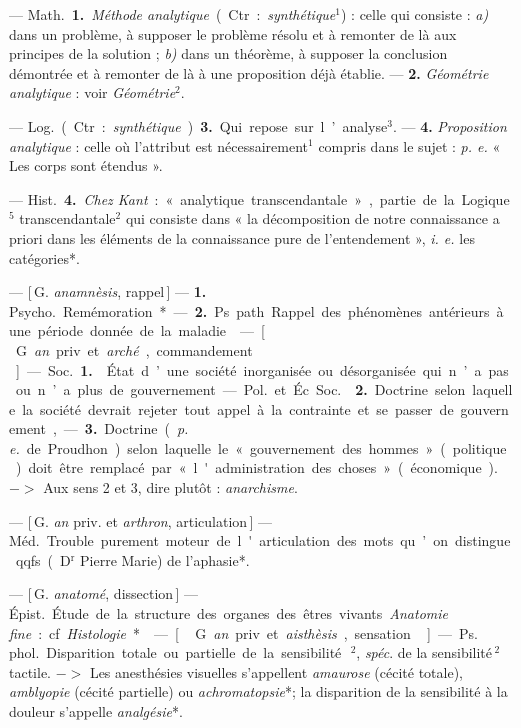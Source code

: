 \begin{itemize}[leftmargin=1cm, label=, itemsep=1pt]
{ — \si{Math.} {\bf 1.} {\it Méthode analytique} (Ctr. : {\it synthétique}$^1$) : celle
qui consiste : {\it a)} dans un problème,
à supposer le problème résolu et à
remonter de là aux principes de la
solution ; {\it b)} dans un théorème, à
supposer la conclusion démontrée et
à remonter de là à une proposition
déjà établie. — {\bf 2.} {\it Géométrie analytique} : voir {\it Géométrie}$^2$.

— \si{Log.} (Ctr. : {\it synthétique}). {\bf 3.} Qui
repose sur l’analyse$^3$. — {\bf 4.} {\it Proposition analytique} : celle où l’attribut
est nécessairement$^1$ compris dans le
sujet : {\it p. e.} « Les corps sont étendus ».

— \si{Hist.} {\bf 4.} {\it Chez Kant} : « analytique transcendantale », partie de
la Logique$^5$ transcendantale$^2$ qui
consiste dans « la décomposition de
notre connaissance a priori dans les
éléments de la connaissance pure de
l’entendement », {\it i. e.} les catégories*.

 — [\,G. {\it anamnèsis}, rappel\,] —
{\bf 1.} \si{Psycho.} Remémoration*. — {\bf 2.} Ps.
path. Rappel des phénomènes antérieurs à une période donnée de la
maladie.

 — [\,G. {\it an} priv. et {\it arché}, commandement\,] — \si{Soc.} {\bf 1.}  État
d’une société inorganisée ou désorganisée qui n’a pas ou n’a plus de
gouvernement.

— \si{Pol.} et Éc. \si{Soc.}  {\bf 2.} Doctrine
selon laquelle la société devrait
rejeter tout appel à la contrainte et
se passer de gouvernement, — {\bf 3.}
Doctrine ({\it p. e.} de Proudhon) selon
laquelle le « gouvernement des
hommes » (politique) doit être remplacé par « l'administration des
choses » (économique). $->$ Aux
sens 2 et 3, dire plutôt : {\it anarchisme}.

 — [\,G. {\it an} priv. et {\it arthron},
articulation\,] — \si{Méd.} Trouble purement moteur de l'articulation des
mots qu’on distingue qqfs (D$^\text{r}$ Pierre
Marie) de l’aphasie*.

 — [\,G. {\it anatomé}, dissection\,]
— \si{Épist.} Étude de la structure des
organes des êtres vivants. {\it Anatomie
fine} : cf.  {\it Histologie}*.

 — [\,G. {\it an} priv. et {\it aisthèsis},
sensation\,] — \si{Ps. phol.} Disparition
totale ou partielle de la sensibilité\,$^2$,
{\it spéc}. de la sensibilité\,$^2$ tactile. $->$
Les anesthésies visuelles s’appellent
{\it amaurose} (cécité totale), {\it amblyopie}
(cécité partielle) ou {\it achromatopsie}*;
la disparition de la sensibilité à la
douleur s’appelle {\it analgésie}*.

}
\end{itemize}
